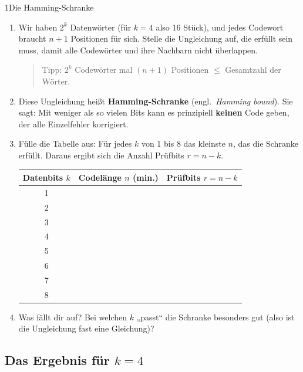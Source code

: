\begin{bleistiftuebung}{1}{Die Hamming-Schranke}
\begin{enumerate}[label=(\alph*), leftmargin=*]
\item Wir haben $2^k$ Datenwörter (für $k = 4$ also 16 Stück), und
  jedes Codewort braucht $n+1$ Positionen für sich. Stelle die
  Ungleichung auf, die erfüllt sein muss, damit alle Codewörter und
  ihre Nachbarn nicht überlappen.

  \begin{quote}
  Tipp: $2^k$ Codewörter mal $(n+1)$ Positionen $\le$ Gesamtzahl der
  Wörter.
  \end{quote}

\item Diese Ungleichung heißt \textbf{Hamming-Schranke} (engl.\ \emph{Hamming
  bound}). Sie sagt: Mit weniger als so vielen Bits kann es prinzipiell
  \textbf{keinen} Code geben, der alle Einzelfehler korrigiert.

\item Fülle die Tabelle aus: Für jedes $k$ von 1 bis 8 das kleinste
  $n$, das die Schranke erfüllt. Daraus ergibt sich die Anzahl
  Prüfbits $r = n - k$.

  \begin{center}
  \begin{tabular}{ccc}
    \toprule
    Datenbits $k$ & Codelänge $n$ (min.) & Prüfbits $r = n - k$ \\
    \midrule
    1 & & \\
    2 & & \\
    3 & & \\
    4 & & \\
    5 & & \\
    6 & & \\
    7 & & \\
    8 & & \\
    \bottomrule
  \end{tabular}
  \end{center}

\item Was fällt dir auf? Bei welchen $k$ „passt“ die Schranke besonders
  gut (also ist die Ungleichung fast eine Gleichung)?
\end{enumerate}
\end{bleistiftuebung}

\subsection*{Das Ergebnis für $k = 4$}

